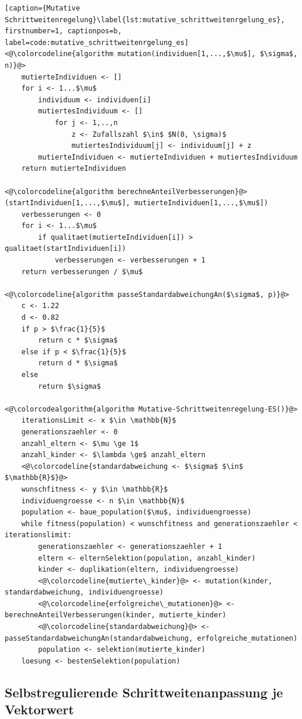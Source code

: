 \begin{lstlisting}[caption={Mutative Schrittweitenregelung}\label{lst:mutative_schrittweitenrgelung_es}, firstnumber=1, captionpos=b, label=code:mutative_schrittweitenrgelung_es]
<@\colorcodeline{algorithm mutation(individuen[1,...,$\mu$], $\sigma$, n)}@>
	mutierteIndividuen <- []
	for i <- 1...$\mu$
		individuum <- individuen[i]
		mutiertesIndividuum <- []		
			for j <- 1,..,n
				z <- Zufallszahl $\in$ $N(0, \sigma)$
				mutiertesIndividuum[j] <- individuum[j] + z
		mutierteIndividuen <- mutierteIndividuen + mutiertesIndividuum
	return mutierteIndividuen
	
<@\colorcodeline{algorithm berechneAnteilVerbesserungen}@>(startIndividuen[1,...,$\mu$], mutierteIndividuen[1,...,$\mu$])
	verbesserungen <- 0	
	for i <- 1...$\mu$
		if qualitaet(mutierteIndividuen[i]) > qualitaet(startIndividuen[i])
			verbesserungen <- verbesserungen + 1
	return verbesserungen / $\mu$
	
<@\colorcodeline{algorithm passeStandardabweichungAn($\sigma$, p)}@>
	c <- 1.22
	d <- 0.82
	if p > $\frac{1}{5}$
		return c * $\sigma$
	else if p < $\frac{1}{5}$
		return d * $\sigma$
	else
		return $\sigma$

<@\colorcodealgorithm{algorithm Mutative-Schrittweitenregelung-ES()}@>
	iterationsLimit <- x $\in \mathbb{N}$
	generationszaehler <- 0
	anzahl_eltern <- $\mu \ge 1$
	anzahl_kinder <- $\lambda \ge$ anzahl_eltern
	<@\colorcodeline{standardabweichung <- $\sigma$ $\in$ $\mathbb{R}$}@>
	wunschfitness <- y $\in \mathbb{R}$
	individuengroesse <- n $\in \mathbb{N}$
	population <- baue_population($\mu$, individuengroesse)
	while fitness(population) < wunschfitness and generationszaehler < iterationslimit:
		generationszaehler <- generationszaehler + 1
		eltern <- elternSelektion(population, anzahl_kinder)
		kinder <- duplikation(eltern, individuengroesse)
		<@\colorcodeline{mutierte\_kinder}@> <- mutation(kinder, standardabweichung, individuengroesse)
		<@\colorcodeline{erfolgreiche\_mutationen}@> <- berechneAnteilVerbesserungen(kinder, mutierte_kinder)
		<@\colorcodeline{standardabweichung}@> <- passeStandardabweichungAn(standardabweichung, erfolgreiche_mutationen)
		population <- selektion(mutierte_kinder)
	loesung <- bestenSelektion(population)
\end{lstlisting}

\subsection{Selbstregulierende Schrittweitenanpassung je Vektorwert}

